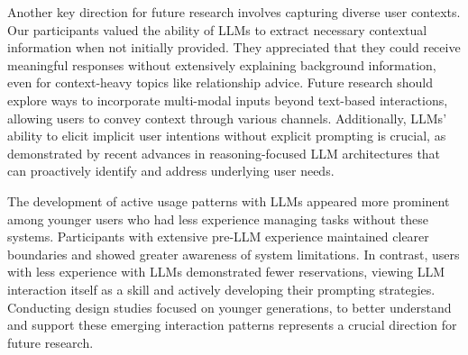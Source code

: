 Another key direction for future research involves capturing diverse user contexts. Our participants valued the ability of LLMs to extract necessary contextual information when not initially provided. They appreciated that they could receive meaningful responses without extensively explaining background information, even for context-heavy topics like relationship advice. Future research should explore ways to incorporate multi-modal inputs beyond text-based interactions, allowing users to convey context through various channels. Additionally, LLMs' ability to elicit implicit user intentions without explicit prompting is crucial, as demonstrated by recent advances in reasoning-focused LLM architectures that can proactively identify and address underlying user needs.

The development of active usage patterns with LLMs appeared more prominent among younger users who had less experience managing tasks without these systems. Participants with extensive pre-LLM experience maintained clearer boundaries and showed greater awareness of system limitations. In contrast, users with less experience with LLMs demonstrated fewer reservations, viewing LLM interaction itself as a skill and actively developing their prompting strategies. Conducting design studies focused on younger generations, to better understand and support these emerging interaction patterns represents a crucial direction for future research.